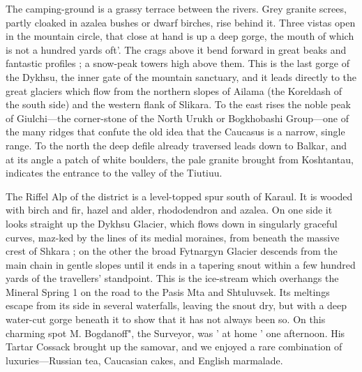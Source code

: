 \documentclass[25pt, a4paper]{article}
\begin{document}
	The camping-ground is a grassy terrace between the rivers. Grey granite screes, partly cloaked in azalea bushes or dwarf birches, rise behind it. Three vistas open in the mountain circle, that close at hand is up a deep gorge, the mouth of which is not a hundred yards oft'. The crags above it bend forward in great beaks and fantastic profiles ; a snow-peak towers high above them. This is the last gorge of the Dykhsu, the inner gate of the mountain sanctuary, and it leads directly to the great glaciers which flow from the northern slopes of Ailama (the Koreldash of the south side) and the western flank of Slikara. To the east rises the noble peak of Giulchi—the corner-stone of the North Urukh or Bogkhobashi Group—one of the many ridges that confute the old idea that the Caucasus is a narrow, single range. To the north the deep defile already traversed leads down to Balkar, and at its angle a patch of white boulders, the pale granite brought from Koshtantau, indicates the entrance to the valley of the Tiutiuu.
	
	The Riffel Alp of the district is a level-topped spur south of Karaul. It is wooded with birch and fir, hazel and alder, rhododendron and azalea. On one side it looks straight up the Dykhsu Glacier, which flows down in singularly graceful curves, maz-ked by the lines of its medial moraines, from beneath the massive crest of Shkara ; on the other the broad Fytnargyn Glacier descends from the main chain in gentle slopes until it ends in a tapering snout within a few hundred yards of the travellers' standpoint. This is the ice-stream which overhangs the Mineral Spring 1 on the road to the Pasis Mta and Shtuluvsek. Its meltings escape from its side in several waterfalls, leaving the snout dry, but with a deep water-cut gorge beneath it to show that it has not always been so. On this charming spot M. Bogdanoff", the Surveyor, was ' at home ' one afternoon. His Tartar Cossack brought up the samovar, and we enjoyed a rare combination of luxuries—Russian tea, Caucasian cakes, and English marmalade.
	
\end{document}
